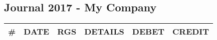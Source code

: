 \documentclass[10pt]{article}
\begin{document}
	\subsection*{Journal 2017 - My Company}

    \small
	\begin{tabular} { | l | l | l | l | r | r | }

        \hline
        \# & DATE & RGS & DETAILS & \multicolumn{1}{l|}{DEBET} & \multicolumn{1}{l|}{CREDIT} \\
        \hline

        

	\end{tabular}
\end{document}
